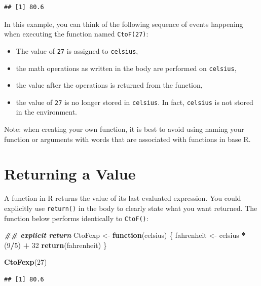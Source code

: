 \documentclass[
]{book}
\newenvironment{Shaded}{\begin{snugshade}}{\end{snugshade}}
\newcommand{\ControlFlowTok}[1]{\textcolor[rgb]{0.13,0.29,0.53}{\textbf{#1}}}
\newcommand{\DecValTok}[1]{\textcolor[rgb]{0.00,0.00,0.81}{#1}}
\newcommand{\DocumentationTok}[1]{\textcolor[rgb]{0.56,0.35,0.01}{\textbf{\textit{#1}}}}
\newcommand{\FunctionTok}[1]{\textcolor[rgb]{0.13,0.29,0.53}{\textbf{#1}}}
\newcommand{\NormalTok}[1]{#1}
\newcommand{\OtherTok}[1]{\textcolor[rgb]{0.56,0.35,0.01}{#1}}
\newcommand{\SpecialCharTok}[1]{\textcolor[rgb]{0.81,0.36,0.00}{\textbf{#1}}}
\providecommand{\tightlist}{%
  \setlength{\itemsep}{0pt}\setlength{\parskip}{0pt}}
\theoremstyle{definition}
\theoremstyle{definition}
\theoremstyle{definition}
\theoremstyle{definition}
\theoremstyle{remark}
\begin{document}
\begin{verbatim}
## [1] 80.6
\end{verbatim}

In this example, you can think of the following sequence of events happening when executing the function named \texttt{CtoF(27)}:

\begin{itemize}
\tightlist
\item
  The value of \texttt{27} is assigned to \texttt{celsius},
\item
  the math operations as written in the body are performed on \texttt{celsius},
\item
  the value after the operations is returned from the function,
\item
  the value of \texttt{27} is no longer stored in \texttt{celsius}. In fact, \texttt{celsius} is not stored in the environment.
\end{itemize}

Note: when creating your own function, it is best to avoid using naming your function or arguments with words that are associated with functions in base R.

\hypertarget{returning-a-value}{%
\section{Returning a Value}\label{returning-a-value}}

A function in R returns the value of its last evaluated expression. You could explicitly use \texttt{return()} in the body to clearly state what you want returned. The function below performs identically to \texttt{CtoF()}:

\begin{Shaded}
\begin{Highlighting}[]
\DocumentationTok{\#\# explicit return}
\NormalTok{CtoFexp }\OtherTok{\textless{}{-}} \ControlFlowTok{function}\NormalTok{(celsius) \{}
\NormalTok{  fahrenheit }\OtherTok{\textless{}{-}}\NormalTok{ celsius }\SpecialCharTok{*}\NormalTok{ (}\DecValTok{9}\SpecialCharTok{/}\DecValTok{5}\NormalTok{) }\SpecialCharTok{+} \DecValTok{32}
  \FunctionTok{return}\NormalTok{(fahrenheit)}
\NormalTok{\}}

\FunctionTok{CtoFexp}\NormalTok{(}\DecValTok{27}\NormalTok{)}
\end{Highlighting}
\end{Shaded}

\begin{verbatim}
## [1] 80.6
\end{verbatim}
\end{document}
